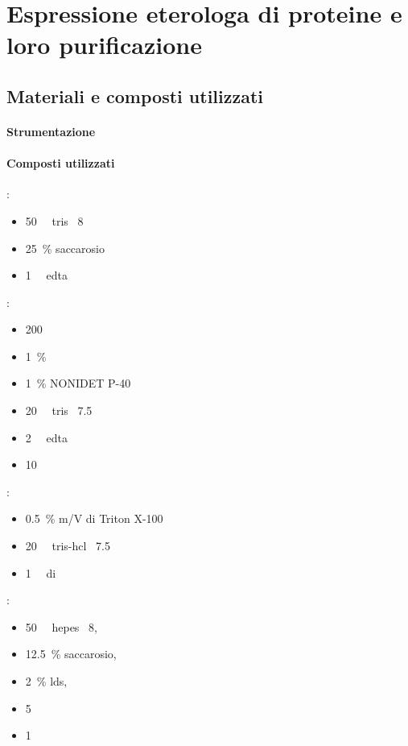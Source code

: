 \section{Espressione eterologa di proteine e loro purificazione}\label{sec:espProteine}

\subsection{Materiali e composti utilizzati}
\paragraph{Strumentazione}


\paragraph{Composti utilizzati}
\begin{itemize}
	\begin{multicols}{2}
	:
	\begin{itemize}[squareItem]
		\item \qty{50}{\milli\Molar} \gls{tris} \pH\ 8
		\item \qty{25}{\percent} saccarosio
		\item \qty{1}{\milli\Molar} \gls{edta}
	\end{itemize}
	:
	\begin{itemize}[squareItem]
		\item \qty{200}{\milli\Molar} 
		\item \qty{1}{\percent} 
		\item \qty{1}{\percent} NONIDET P-40
		\item \qty{20}{\milli\Molar} \gls{tris} \pH\ \num{7.5}
		\item \qty{2}{\milli\Molar} \gls{edta}
		\item \qty{10}{\milli\Molar} 
	\end{itemize}
	:
	\begin{itemize}[squareItem]
		\item \qty{0.5}{\percent} m/V di Triton X-100
		\item \qty{20}{\milli\Molar} \gls{tris-hcl} \pH\ \num{7.5}
		\item \qty{1}{\milli\Molar} di 
	\end{itemize}
	:
	\begin{itemize}[squareItem]
		\item \qty{50}{\milli\Molar} \gls{hepes} \pH\ 8, 
		\item \qty{12.5}{\percent} saccarosio, 
		\item \qty{2}{\percent} \gls{lds}, 
		\item \qty{5}{\milli\Molar} 
		\item \qty{1}{\milli\Molar} 
	\end{itemize}
	\end{multicols}
\end{itemize}

